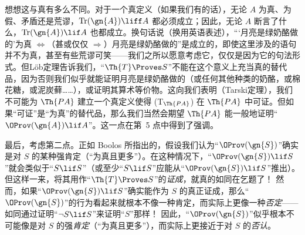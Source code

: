 想想这与真有多么不同。对于一个真定义（如果我们有的话），无论 $A$ 为真、为假、矛盾还是荒谬，$\mathrm{Tr}(\gn{A})
\liff A$ 都必须成立；因此，无论 $A$ 断言了什么，$\mathrm{Tr}(\gn{A}) \lif A$ 也都成立。换句话说（换用英语表述），“‘月亮是绿奶酪做的’为真 $\Leftrightarrow$（甚或仅仅 $\Rightarrow$）月亮是绿奶酪做的”是成立的，即使这里涉及的语句并不为真，甚至有些荒谬可笑——我们之所以愿意考虑它，仅仅是因为它的句法形式。但Löb定理告诉我们，“$\Th{T} \Proves S$”不能在这个意义上充当真的替代品，因为否则我们似乎就能证明月亮是绿奶酪做的（或任何其他种类的奶酪，或棉花糖，或泥炭藓……），或证明其算术等价物。这向我们表明（Tarski定理），我们不可能为 $\Th{PA}$ 建立一个真定义使得 (T$_{\Th{PA}}$) 在 $\Th{PA}$ 中可证。但如果“可证”是“为真”的替代品，那么我们当然会期望 $\Th{PA}$ 能一般地证明“$\OProv(\gn{A}) \lif A$”。这一点在第~5 点中得到了强调。

最后，考虑第二点。正如 Boolos 所指出的，假设我们认为“$\OProv(\gn{S})$”确实是对 $S$ 的某种强肯定（“为真且更多”）。在这种情况下，“$\OProv(\gn{S}) \lif S$”就会类似于“$S \lif S$”（或至少“$S \lif S$”应能从“$\OProv(\gn{S}) \lif S$”推出）。但这样一来，将其用作“$\Th{T}\Proves S$”的\emph{证成}，就真的如同在乞题了！{} 然而，如果“$\OProv(\gn{S}) \lif S$”确实能作为 $S$ 的真正证成，那么“$\OProv(\gn{S})$”的行为看起来就根本不像一种肯定，而实际上更像一种\emph{否定}——如同通过证明“$\lnot S \lif S$”来证明“$S$”那样！{} 因此，“$\OProv(\gn{S})$”似乎根本不可能像是对 $S$ 的强\emph{肯定}（“为真且更多”），而实际上更接近于对 $S$ 的\emph{否认}。